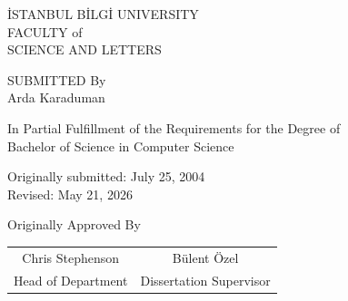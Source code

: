 \begin{titlepage}
\vspace*{\fill}
\begin{center}
\Large
\.{I}STANBUL B\.{I}LG\.{I} UNIVERSITY\\
FACULTY of\\
SCIENCE AND LETTERS\\

\vspace{3\bigskipamount}

\large
{\em \disstitle}

\vspace{3\bigskipamount}

SUBMITTED By\\
Arda Karaduman

\vspace{2\bigskipamount}

In Partial Fulfillment of the Requirements for the Degree of\\
Bachelor of Science in Computer Science\\

\vspace{2\bigskipamount}

Originally submitted: July 25, 2004\\
Revised: May 21, 2026

\vspace{3\bigskipamount}

Originally Approved By\\

\begin{tabular*}{\textwidth}{@{\extracolsep{\fill}}cc}
Chris Stephenson	&	B\"{u}lent \"{O}zel \\
Head of Department	&	Dissertation Supervisor\\
\end{tabular*}

\end{center}
\vspace*{\fill}\par
\end{titlepage}
